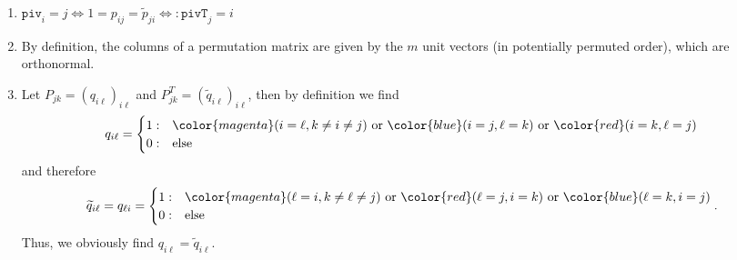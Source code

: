 {
\color{solution}
\begin{enumerate}
	\item $\texttt{piv}_i = j \Leftrightarrow 1 = p_{ij} = \widetilde{p}_{ji} \Leftrightarrow: \texttt{pivT}_j = i $
	\item By definition, the columns of a permutation matrix are given by the $m$ unit vectors (in potentially permuted order), which are orthonormal.
	
	\item Let $P_{jk} = (q_{i\ell})_{i\ell}$ and $P^T_{jk} = (\widetilde{q}_{i\ell})_{i\ell}$, then by definition we find
	$$q_{i\ell} = \begin{cases}
	1: &{\color{magenta}(i = \ell,  k \neq i\neq j)} \text{~or~} {\color{blue}(i = j, \ell = k)} \text{~or~}  {\color{red}(i = k, \ell = j)}\\
	0: &\text{else} 
	\end{cases} $$
	and therefore 
		$$\widetilde{q}_{i\ell}=q_{\ell i} = \begin{cases}
	1: &{\color{magenta}(\ell = i,  k \neq \ell\neq j)} \text{~or~} {\color{red}(\ell = j, i = k)} \text{~or~}  {\color{blue}(\ell = k, i = j)}\\
	0: &\text{else} 
	\end{cases} .$$
	Thus, we obviously find $q_{i\ell}=\widetilde{q}_{i\ell}$.	
\end{enumerate}
}
